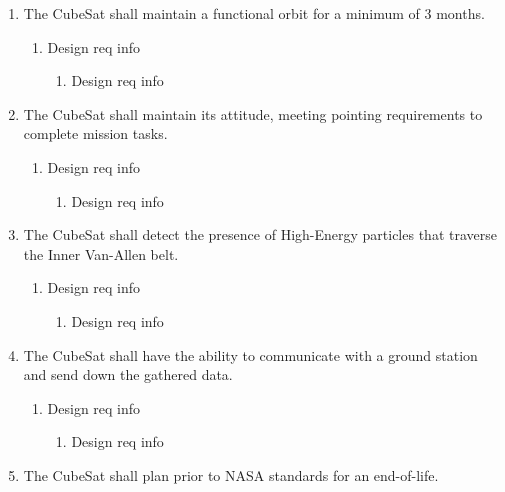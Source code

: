 \documentclass[3p]{elsarticle}
\begin{document}
\begin{enumerate}
\begin{enumerate}
        \begin{enumerate}
            \item Design req info
        \end{enumerate}
    \end{enumerate}
    \item The CubeSat shall maintain a functional orbit for a minimum of 3 months.
    \begin{enumerate}
        \item Design req info
        \begin{enumerate}
            \item Design req info
        \end{enumerate}
    \end{enumerate}
    \item The CubeSat shall maintain its attitude, meeting pointing requirements to complete mission tasks.
    \begin{enumerate}
        \item Design req info
        \begin{enumerate}
            \item Design req info
        \end{enumerate}
    \end{enumerate}
    \item The CubeSat shall detect the presence of High-Energy particles that traverse the Inner Van-Allen belt.
    \begin{enumerate}
        \item Design req info
        \begin{enumerate}
            \item Design req info
        \end{enumerate}
    \end{enumerate}
    \item The CubeSat shall have the ability to communicate with a ground station and send down the gathered data.
    \begin{enumerate}
        \item Design req info
        \begin{enumerate}
            \item Design req info
        \end{enumerate}
    \end{enumerate}
    \item The CubeSat shall plan prior to NASA standards for an end-of-life.
    \begin{enumerate}

\end{enumerate}
\end{enumerate}
\end{document}
